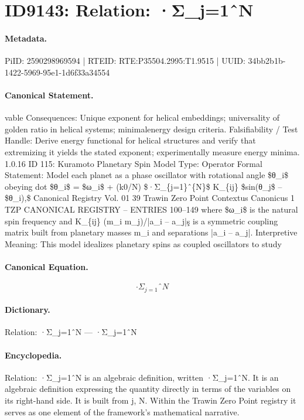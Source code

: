 \section*{ID9143: Relation: ·Σ\_j=1ˆN}
\paragraph{Metadata.}
PiID: 2590298969594 | RTEID: RTE:P35504.2995:T1.9515 | UUID: 34bb2b1b-1422-5969-95e1-1d6f33a34554

\paragraph{Canonical Statement.}
vable Consequences: Unique exponent for helical embeddings; universality of golden ratio in helical systems; minimalenergy design criteria. Falsifiability / Test Handle: Derive energy functional for helical structures and verify that extremizing it yields the stated exponent; experimentally measure energy minima. 1.0.16 ID 115: Kuramoto Planetary Spin Model Type: Operator Formal Statement: Model each planet as a phase oscillator with rotational angle \$θ\_i\$ obeying dot \$θ\_i\$ = \$ω\_i\$ + (k0/N) \$·Σ\_\{j=1\}ˆ\{N\}\$ K\_\{ij\} \$sin(θ\_j\$ – \$θ\_i),\$ Canonical Registry Vol. 01 39 Trawin Zero Point Contextus Canonicus 1 TZP CANONICAL REGISTRY – ENTRIES 100–149 where \$ω\_i\$ is the natural spin frequency and K\_\{ij\} (m\_i m\_j)/|a\_i – a\_j|ş is a symmetric coupling matrix built from planetary masses m\_i and separations |a\_i – a\_j|. Interpretive Meaning: This model idealizes planetary spins as coupled oscillators to study

\paragraph{Canonical Equation.}
\[
·Σ_{j=1}ˆ{N}
\]

\paragraph{Dictionary.}
Relation: ·Σ\_j=1ˆN — ·Σ\_j=1ˆN

\paragraph{Encyclopedia.}
Relation: ·Σ\_j=1ˆN is an algebraic definition, written ·Σ\_j=1ˆN. It is an algebraic definition expressing the quantity directly in terms of the variables on its right-hand side. It is built from j, N. Within the Trawin Zero Point registry it serves as one element of the framework's mathematical narrative.
